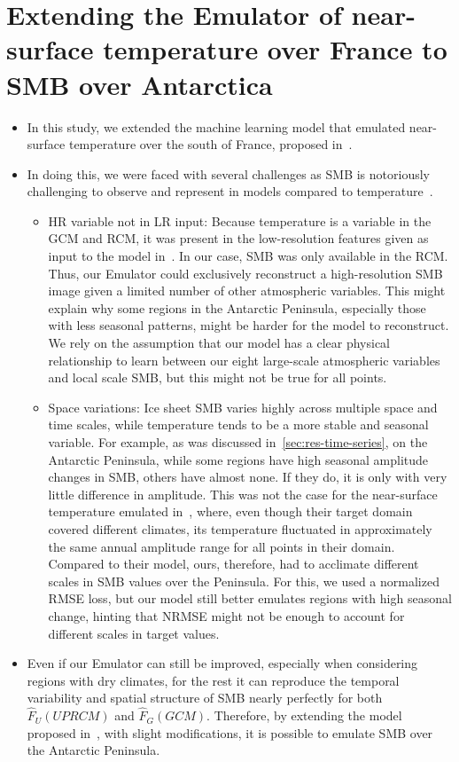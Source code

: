\documentclass[a4paper,11pt,oneside]{report}
\begin{document}
\section{Extending the Emulator of near-surface temperature over France to SMB over Antarctica}\label{sec:extension-doury}
\begin{itemize}
    \item In this study, we extended the machine learning model that emulated near-surface temperature over the south of France, proposed in~\cite{Doury}. 
    \item In doing this, we were faced with several challenges as SMB is notoriously challenging to observe and represent in models compared to temperature~\cite{Lenaerts2019}. 
    \begin{itemize}
        \item HR variable not in LR input: Because temperature is a variable in the GCM and RCM, it was present in the low-resolution features given as input to the model in~\cite{Doury}. In our case, SMB was only available in the RCM. Thus, our Emulator could exclusively reconstruct a high-resolution SMB image given a limited number of other atmospheric variables. This might explain why some regions in the Antarctic Peninsula, especially those with less seasonal patterns, might be harder for the model to reconstruct. We rely on the assumption that our model has a clear physical relationship to learn between our eight large-scale atmospheric variables and local scale SMB, but this might not be true for all points. 
        \item Space variations: Ice sheet SMB varies highly across multiple space and time scales, while temperature tends to be a more stable and seasonal variable. For example, as was discussed in~\ref{sec:res-time-series}, on the Antarctic Peninsula, while some regions have high seasonal amplitude changes in SMB, others have almost none. If they do, it is only with very little difference in amplitude. This was not the case for the near-surface temperature emulated in~\cite{Doury}, where, even though their target domain covered different climates, its temperature fluctuated in approximately the same annual amplitude range for all points in their domain. Compared to their model, ours, therefore, had to acclimate different scales in SMB values over the Peninsula. For this, we used a normalized RMSE loss, but our model still better emulates regions with high seasonal change, hinting that NRMSE might not be enough to account for different scales in target values. 
    \end{itemize}
    \item Even if our Emulator can still be improved, especially when considering regions with dry climates, for the rest it can reproduce the temporal variability and spatial structure of SMB nearly perfectly for both $\hat{F}_{U}(UPRCM)$ and $\hat{F}_{G}(GCM)$. Therefore, by extending the model proposed in~\cite{Doury}, with slight modifications, it is possible to emulate SMB over the Antarctic Peninsula. 
\end{itemize}
\end{document}
